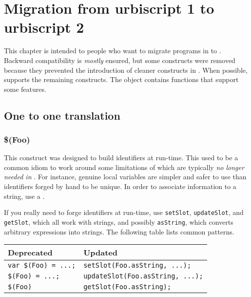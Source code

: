 \chapter{Migration from urbiscript 1 to urbiscript 2}
\label{sec:k1}

This chapter is intended to people who want to migrate programs in  to .  Backward compatibility is \emph{mostly} ensured, but some
 constructs were removed because they prevented the introduction
of cleaner constructs in .  When possible,  supports the
remaining  constructs.  The  object contains
functions that support some  features.

\section{One to one translation}

\subsection{\$(Foo)}
\label{sec:k122:dollar}

This construct was designed to build identifiers at run-time.  This
used to be a common idiom to work around some limitations of 
which are typically \emph{no longer needed in }.  For instance,
genuine local variables are simpler and safer to use than identifiers
forged by hand to be unique.  In order to associate information to a
string, use a .

If you really need to forge identifiers at run-time, use
\lstinline{setSlot}, \lstinline{updateSlot}, and \lstinline{getSlot},
which all work with strings, and possibly \lstinline{asString}, which
converts arbitrary expressions into strings.  The
following table lists common patterns.

\begin{center}
  \begin{tabular}{|l|l|}
    \hline
    \textbf{Deprecated} & \textbf{Updated}  \\
    \hline
    \lstinline|var $(Foo) = ...;| & \lstinline|setSlot(Foo.asString, ...);|   \\
    \lstinline|$(Foo) = ...;|     & \lstinline|updateSlot(Foo.asString, ...);|\\
    \lstinline|$(Foo)|            & \lstinline|getSlot(Foo.asString);|\\
    \hline
  \end{tabular}%
\end{center}

